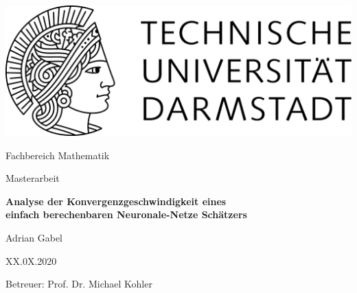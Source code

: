 \begin{titlepage}
  \begin{center}
    \vspace{1cm}
    \includegraphics[width=0.5\linewidth]{TU_Darmstadt_Logo.pdf}
    \vspace{1cm}
    
    \large{Fachbereich Mathematik}
    \vspace{2.5cm}
    
    \large{Masterarbeit}
    \vspace{2cm}

    \Large{\textbf{Analyse der Konvergenzgeschwindigkeit eines \\ einfach berechenbaren Neuronale-Netze Schätzers}}
    
    \vspace*{3cm}    
    
		\large
                Adrian Gabel
    \vspace*{1.0cm}

    XX.0X.2020 \\
    \vspace*{2cm}

    Betreuer: Prof. Dr. Michael Kohler

    \vspace*{.5cm}

    \vspace*{\fill}
  \end{center}
\end{titlepage}
\vspace*{\fill}
